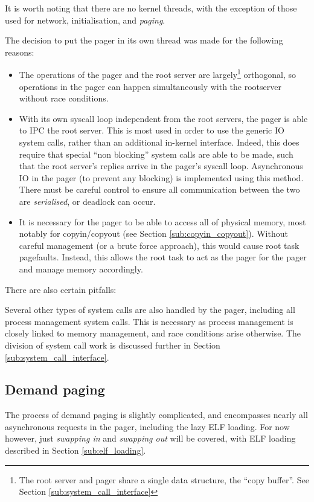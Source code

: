 \documentclass[12pt,english]{article}
\begin{document}
It is worth noting that there are no kernel threads, with the exception of those used for network, initialisation, and \emph{paging}.

The decision to put the pager in its own thread was made for the following reasons:
\begin{itemize}
\item The operations of the pager and the root server are largely\footnote{The root server and pager share a single data structure, the ``copy buffer''.  See Section \ref{sub:system_call_interface}} orthogonal, so operations in the pager can happen simultaneously with the rootserver without race conditions.
\item With its own syscall loop independent from the root servers, the pager is able to IPC the root server.  This is most used in order to use the generic IO system calls, rather than an additional in-kernel interface.  Indeed, this does require that special ``non blocking'' system calls are able to be made, such that the root server's replies arrive in the pager's syscall loop.  Asynchronous IO in the pager (to prevent any blocking) is implemented using this method.  There must be careful control to ensure all communication between the two are \emph{serialised}, or deadlock can occur.
\item It is necessary for the pager to be able to access all of physical memory, most notably for copyin/copyout (see Section \ref{sub:copyin_copyout}).  Without careful management (or a brute force approach), this would cause root task pagefaults.  Instead, this allows the root task to act as the pager for the pager and manage memory accordingly.
\end{itemize}

There are also certain pitfalls:


Several other types of system calls are also handled by the pager, including all process management system calls.  This is necessary as process management is closely linked to memory management, and race conditions arise otherwise.  The division of system call work is discussed further in Section \ref{sub:system_call_interface}.

\subsection{Demand paging} \label{sub:demand_paging}

The process of demand paging is slightly complicated, and encompasses nearly all asynchronous requests in the pager, including the lazy ELF loading.  For now however, just \emph{swapping in} and \emph{swapping out} will be covered, with ELF loading described in Section \ref{sub:elf_loading}.
\end{document}
